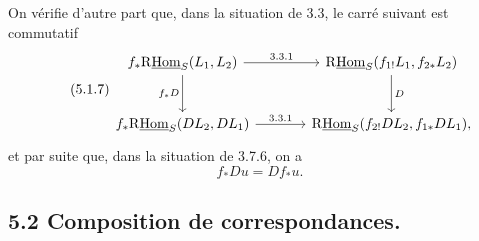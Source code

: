 On vérifie d'autre part que, dans la situation de 3.3, le carré suivant est commutatif
\begin{equation}
\tag{5.1.7}
\begin{tikzcd}[column sep=large,row sep=large]
f_*\mathrm{R}\underline{\mathrm{Hom}}_S(L_1,L_2) \arrow[r,"3.3.1"] \arrow[d,"f_*D"']
& \mathrm{R}\underline{\mathrm{Hom}}_S(f_{1!}L_1,f_{2*}L_2) \arrow[d,"D"] \\
f_*\mathrm{R}\underline{\mathrm{Hom}}_S(DL_2,DL_1) \arrow[r,"3.3.1"]
& \mathrm{R}\underline{\mathrm{Hom}}_S(f_{2!}DL_2,f_{1*}DL_1),
\end{tikzcd}
\end{equation}
et par suite que, dans la situation de 3.7.6, on a
\begin{equation}
\tag{5.1.8}
f_*Du=Df_*u.
\end{equation}

\subsection*{5.2 Composition de correspondances.}

